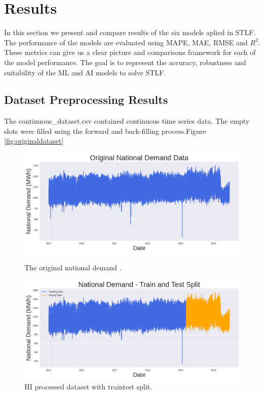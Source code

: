 \chapter{Results}
In this section we present and compare results of the six models aplied in STLF. The performance of the models are evaluated using MAPE, MAE, RMSE and $R^2$. These metrics can give us a clear picture and comparisons framework for each of the model performance.  The goal is to represent the accuracy, robustness and suitability of the ML and AI models to solve STLF.




\section{Dataset Preprocessing Results}
 The continuous\_dataset.csv contained continuous time series data. The empty slots were filled using the forward and back-filling process.Figure \ref{fig:originaldataset}
 \begin{figure}[h]
 	\centering
 \begin{minipage}[b]{0.45\linewidth}
 	\centering
 	\includegraphics[width=\linewidth]{Chapters/images/results/original_dataset}
 	\caption{The original national demand .}
 	\label{fig:originaldataset}
 \end{minipage}
 \begin{minipage}[b]{0.45\linewidth}
 	\centering
 	\includegraphics[width=\linewidth]{"Chapters/images/results/train test split_after HI"}
 	\caption{HI processed dataset with traintest split.}
 	\label{fig:train-test-splitafter-hi}
 \end{minipage}
 \end{figure}
 
